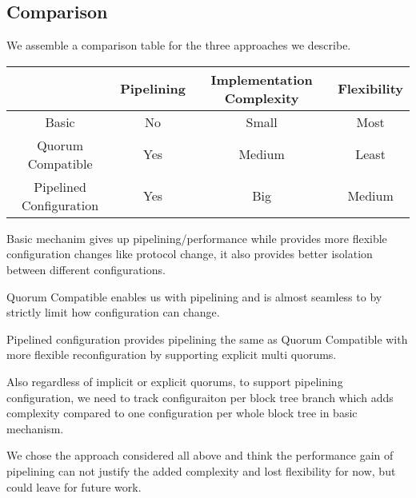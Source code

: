 \subsection{Comparison}
We assemble a comparison table for the three approaches we describe.
\begin{table*}[h]
\begin{tabular}{|c|c|c|c|}

\hline
& Pipelining & Implementation Complexity & Flexibility\\
\hline \hline
Basic & No & Small & Most\\
Quorum Compatible & Yes & Medium & Least\\
Pipelined Configuration & Yes & Big & Medium\\
\hline

\end{tabular}
\end{table*}

Basic mechanim gives up pipelining/performance while provides more flexible configuration changes like protocol change, it also provides better
isolation between different configurations.

Quorum Compatible enables us with pipelining and is almost seamless to \LBFT by strictly limit how configuration can change.

Pipelined configuration provides pipelining the same as Quorum Compatible with more flexible reconfiguration by supporting explicit multi quorums.

Also regardless of implicit or explicit quorums, to support pipelining configuration, we need to track configuraiton per block tree branch which
adds complexity compared to one configuration per whole block tree in basic mechanism.

We chose the approach considered all above and think the performance gain of pipelining can not justify the added complexity and
lost flexibility for now, but could leave for future work.
